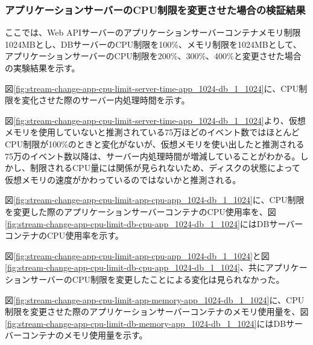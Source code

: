\documentclass[../../../../main]{subfiles}
\begin{document}
    \subsubsection{アプリケーションサーバーのCPU制限を変更させた場合の検証結果}\label{subsubsec:result-streaming-change-app-cpu}

    ここでは、Web APIサーバーのアプリケーションサーバーコンテナメモリ制限1024MBとし、DBサーバーのCPU制限を100\%、メモリ制限を1024MBとして、アプリケーションサーバーのCPU制限を200\%、300\%、400\%と変更させた場合の実験結果を示す。


    図\ref{fig:stream-change-app-cpu-limit-server-time-app_1024-db_1_1024}に、CPU制限を変化させた際のサーバー内処理時間を示す。

    

    図\ref{fig:stream-change-app-cpu-limit-server-time-app_1024-db_1_1024}より、仮想メモリを使用していないと推測されている75万ほどのイベント数ではほとんどCPU制限が100\%のときと変化がないが、仮想メモリを使い出したと推測される75万のイベント数以降は、サーバー内処理時間が増減していることがわかる。しかし、制限されるCPU量には関係が見られないため、ディスクの状態によって仮想メモリの速度がかわっているのではないかと推測される。


    図\ref{fig:stream-change-app-cpu-limit-app-cpu-app_1024-db_1_1024}に、CPU制限を変更した際のアプリケーションサーバーコンテナのCPU使用率を、図\ref{fig:stream-change-app-cpu-limit-db-cpu-app_1024-db_1_1024}にはDBサーバーコンテナのCPU使用率を示す。

    

    

    図\ref{fig:stream-change-app-cpu-limit-app-cpu-app_1024-db_1_1024}と図\ref{fig:stream-change-app-cpu-limit-db-cpu-app_1024-db_1_1024}、共にアプリケーションサーバーのCPU制限を変更したことによる変化は見られなかった。


    図\ref{fig:stream-change-app-cpu-limit-app-memory-app_1024-db_1_1024}に、CPU制限を変更させた際のアプリケーションサーバーコンテナのメモリ使用量を、図\ref{fig:stream-change-app-cpu-limit-db-memory-app_1024-db_1_1024}にはDBサーバーコンテナのメモリ使用量を示す。
\end{document}
